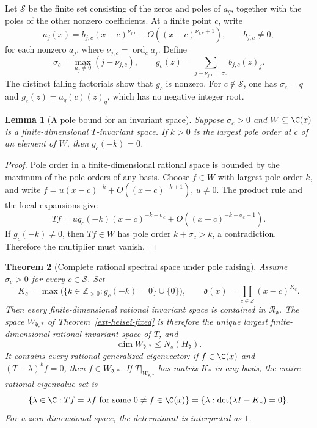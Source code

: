 \documentclass[11pt,a4paper]{article}
\newtheorem{theorem}{Theorem}[section]
\newtheorem{lemma}[theorem]{Lemma}
\theoremstyle{definition}\newtheorem{definition}[theorem]{Definition}
\theoremstyle{remark}\newtheorem{remark}[theorem]{Remark}
\numberwithin{equation}{section}
\begin{document}
Let $\mathcal S$ be the finite set consisting of the zeros and poles of
$a_q$, together with the poles of the other nonzero coefficients.  At a
finite point $c$, write
\[
 a_j(x)=b_{j,c}(x-c)^{\nu_{j,c}}
       +O((x-c)^{\nu_{j,c}+1}),\qquad b_{j,c}\ne0,
\]
for each nonzero $a_j$, where $\nu_{j,c}=\operatorname{ord}_c a_j$.  Define
\begin{equation}
 \sigma_c=\max_{a_j\ne0}(j-\nu_{j,c}),
 \qquad
 g_c(z)=\sum_{j-\nu_{j,c}=\sigma_c}b_{j,c}(z)_j.
 \label{ext-heisei-local-data}
\end{equation}
The distinct falling factorials show that $g_c$ is nonzero.  For
$c\notin\mathcal S$, one has $\sigma_c=q$ and
$g_c(z)=a_q(c)(z)_q$, which has no negative integer root.

\begin{lemma}[A pole bound for an invariant space]
\label{ext-heisei-local-lemma}
Suppose $\sigma_c>0$ and $W\subseteq\C(x)$ is a finite-dimensional
$T$-invariant space.  If $k>0$ is the largest pole order at $c$ of an
element of $W$, then $g_c(-k)=0$.
\end{lemma}

\begin{proof}
Pole order in a finite-dimensional rational space is bounded by the maximum
of the pole orders of any basis.  Choose $f\in W$ with largest pole order
$k$, and write $f=u(x-c)^{-k}+O((x-c)^{-k+1})$, $u\ne0$.  The product rule
and the local expansions give
\[
 Tf=u g_c(-k)(x-c)^{-k-\sigma_c}
       +O((x-c)^{-k-\sigma_c+1}).
\]
If $g_c(-k)\ne0$, then $Tf\in W$ has pole order $k+\sigma_c>k$, a
contradiction.  Therefore the multiplier must vanish.
\end{proof}

\begin{theorem}[Complete rational spectral space under pole raising]
\label{ext-heisei-global}
Assume $\sigma_c>0$ for every $c\in\mathcal S$.  Set
\begin{equation}
 K_c=\max\bigl(\{k\in\mathbb Z_{>0}:g_c(-k)=0\}\cup\{0\}\bigr),
 \qquad
 \mathfrak d(x)=\prod_{c\in\mathcal S}(x-c)^{K_c}.
 \label{ext-heisei-denominator}
\end{equation}
Then every finite-dimensional rational invariant space is contained in
$\mathcal R_{\mathfrak d}$.  The space $W_{\mathfrak d,*}$ of
Theorem~\ref{ext-heisei-fixed} is therefore the unique largest
finite-dimensional rational invariant space of $T$, and
\[
 \dim W_{\mathfrak d,*}\le N_s(H_{\mathfrak d}).
\]
It contains every rational generalized eigenvector: if
$f\in\C(x)$ and $(T-\lambda)^k f=0$, then $f\in W_{\mathfrak d,*}$.
If $T|_{W_{\mathfrak d,*}}$ has matrix $K_*$ in any basis, the entire
rational eigenvalue set is
\[
 \{\lambda\in\C:Tf=\lambda f\text{ for some }0\ne f\in\C(x)\}
   =\{\lambda:\det(\lambda I-K_*)=0\}.
\]
For a zero-dimensional space, the determinant is interpreted as $1$.
\end{theorem}
\end{document}
